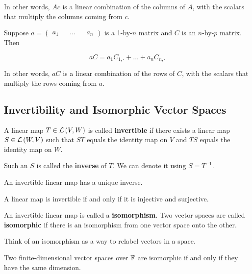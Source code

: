 In other words, $Ac$ is a linear combination of the columns of $A$,
with the scalars that multiply the columns coming from $c$.

\begin{theorem}
   Suppose $a = \begin{pmatrix*} a_1 && \dots && a_n \end{pmatrix*}$ is
   a 1-by-$n$ matrix and $C$ is an $n$-by-$p$ matrix. Then

   \[ aC = a_1 C_{1, \cdot} + \dots + a_n C_{n, \cdot} \]
\end{theorem}

In other words, $aC$ is a linear combination of the rows of $C$,
with the scalars that multiply the rows coming from $a$.

\subsection{Invertibility and Isomorphic Vector Spaces}

\begin{definition} 
   A linear map $T \in \mathcal{L} \left( V, W \right)$ is called \textbf{invertible} if
   there exists a linear map $S \in \mathcal{L} \left( W, V \right)$ such that $ST$ equals
   the identity map on $V$ and $TS$ equals the identity map on $W$.

   Such an $S$ is called the \textbf{inverse} of $T$. We can denote
   it using $S = T^{-1}$.
\end{definition}

\begin{theorem} 
   An invertible linear map has a unique inverse.
\end{theorem}

\begin{theorem}
   A linear map is invertible if and only if it is injective and surjective.
\end{theorem}

\begin{definition} 
   An invertible linear map is called a \textbf{isomorphism}. Two
   vector spaces are called \textbf{isomorphic} if there is
   an isomorphism from one vector space onto the other.
\end{definition}

Think of an isomorphism as a way to relabel vectors in a space.

\begin{theorem} 
   Two finite-dimensional vector spaces over $\operatorname{\mathbb{F}}$ are isomorphic
   if and only if they have the same dimension.
\end{theorem}

